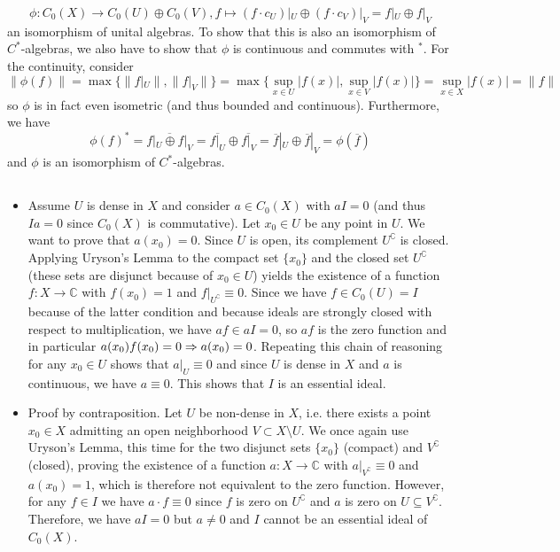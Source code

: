 \documentclass[a4paper]{article}
\begin{document}
\begin{itemize}
    \begin{equation*}
        \phi: C_0(X) \to C_0(U) \oplus C_0(V), f \mapsto (f \cdot c_U)|_U \oplus (f \cdot c_V)|_V = f|_U \oplus f|_V
    \end{equation*}
    an isomorphism of unital algebras. To show that this is also an isomorphism of $C^*$-algebras, we also have to show that $\phi$ is continuous and commutes with $^*$. For the continuity, consider
    \begin{equation*}
        \| \phi(f) \| = \max\{ \| f|_U \|, \| f|_V \| \} = \max \{ \sup_{x \in U} | f(x) |, \sup_{x \in V} | f(x) | \} = \sup_{x \in X} |f(x)| = \|f\|
    \end{equation*}
    so $\phi$ is in fact even isometric (and thus bounded and continuous). Furthermore, we have
    \begin{equation*}
        \phi(f)^* = \overline{f|_U \oplus f|_V} = \overline{f|_U} \oplus \overline{f|_V} = \overline{f}|_U \oplus \overline{f}|_V =  \phi(\overline{f})
    \end{equation*}
    and $\phi$ is an isomorphism of $C^*$-algebras.
\end{itemize}



\addtocounter{subsection}{1}
\subsection{}

\begin{itemize}
    \item Assume $U$ is dense in $X$ and consider $a \in C_0(X)$ with $aI = 0$ (and thus $Ia = 0$ since $C_0(X)$ is commutative). Let $x_0 \in U$ be any point in $U$. We want to prove that $a(x_0) = 0$. Since $U$ is open, its complement $U^\complement$ is closed. Applying Uryson's Lemma to the compact set $\{x_0\}$ and the closed set $U^\complement$ (these sets are disjunct because of $x_0 \in U$) yields the existence of a function $f: X \to \mathds{C}$ with $f(x_0) = 1$ and $f|_{U^\complement} \equiv 0$. Since we have $f \in C_0(U) = I$ because of the latter condition and because ideals are strongly closed with respect to multiplication, we have $a f \in aI = 0$, so $a f$ is the zero function and in particular $a(x_0) f(x_0) = 0 \Rightarrow a(x_0) = 0$. Repeating this chain of reasoning for any $x_0 \in U$ shows that $a|_U \equiv 0$ and since $U$ is dense in $X$ and $a$ is continuous, we have $a \equiv 0$. This shows that $I$ is an essential ideal.
    \item Proof by contraposition. Let $U$ be non-dense in $X$, i.e. there exists a point $x_0 \in X$ admitting an open neighborhood $V \subset X \setminus U$. We once again use Uryson's Lemma, this time for the two disjunct sets $\{x_0\}$ (compact) and $V^\complement$ (closed), proving the existence of a function $a: X \to \mathds{C}$ with $a|_{V^\complement} \equiv 0$ and $a(x_0) = 1$, which is therefore not equivalent to the zero function. However, for any $f \in I$ we have $a \cdot f \equiv 0$ since $f$ is zero on $U^\complement$ and $a$ is zero on $U \subseteq V^\complement$. Therefore, we have $aI = 0$ but $a \neq 0$ and $I$ cannot be an essential ideal of $C_0(X)$.
\end{itemize}
\end{document}
